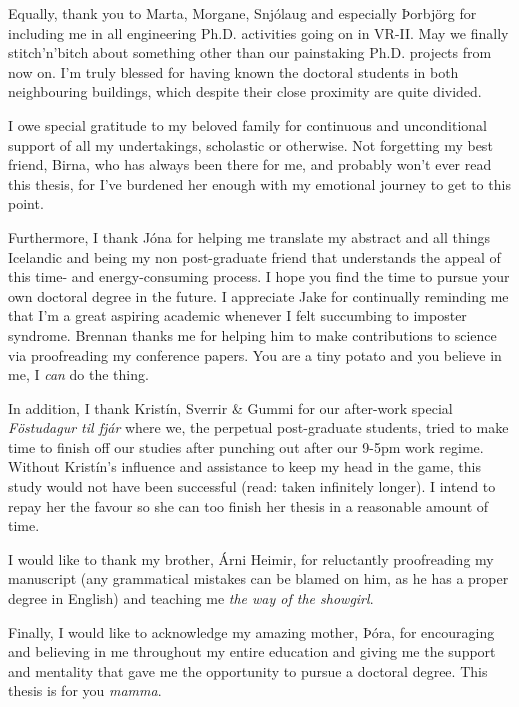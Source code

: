 Equally, thank you to Marta, Morgane, Snjólaug and especially Þorbjörg for 
including me in all engineering Ph.D. activities going on in VR-II. 
May we finally stitch'n'bitch about something other than our painstaking Ph.D. 
projects from now on.  
I'm truly blessed for having known the doctoral students in both neighbouring 
buildings, which despite their close proximity are quite divided.

I owe special gratitude to my beloved family for continuous and unconditional 
support of all my undertakings, scholastic or otherwise. 
Not forgetting my best friend, Birna, who has always been there for me, and 
probably won't ever read this thesis, for I've burdened her enough with my 
emotional journey to get to this point. 

Furthermore, I thank Jóna for helping me translate my abstract and all things 
Icelandic and being my non post-graduate friend that understands the appeal of 
this time- and energy-consuming process. I hope you find the time to pursue 
your own doctoral degree in the future.
I appreciate Jake for continually reminding me that I'm a great aspiring 
academic whenever I felt succumbing to imposter syndrome.
Brennan thanks me for helping him to make contributions to science via 
proofreading my conference papers. You are a tiny potato and you believe in me, 
I \emph{can} do the thing.

In addition, I thank Kristín, Sverrir \& Gummi for our after-work special 
\emph{Föstudagur til fjár} where we, the perpetual post-graduate students, 
tried to make time to finish off our studies after punching out after our 9-5pm 
work regime. 
Without Kristín's influence and assistance to keep my head in the game, this 
study would not have been successful (read: taken infinitely longer). I intend 
to repay her the favour so she can too finish her thesis in a reasonable amount 
of time.

I would like to thank my brother, Árni Heimir, for reluctantly proofreading my 
manuscript (any grammatical mistakes can be blamed on him, as he has a proper 
degree in English) and teaching me \emph{the way of the showgirl}.

Finally, I would like to acknowledge my amazing mother, Þóra, for encouraging 
and believing in me throughout my entire education and giving me the support 
and mentality that gave me the opportunity to pursue a doctoral degree. This 
thesis is for you \emph{mamma}.

